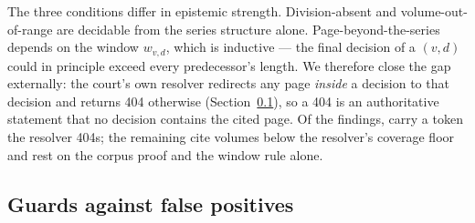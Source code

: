 \documentclass[11pt,a4paper]{article}
\begin{document}
The three conditions differ in epistemic strength. Division-absent and
volume-out-of-range are decidable from the series structure alone.
Page-beyond-the-series depends on the window $w_{v,d}$, which is
inductive --- the final decision of a $(v,d)$ could in principle exceed
every predecessor's length. We therefore close the gap externally: the
court's own resolver redirects any page \emph{inside} a decision to
that decision and returns 404 otherwise (Section~\ref{sec:guards}), so
a 404 is an authoritative statement that no decision contains the
cited page. Of the \NFindings{} findings, \NFindConfirmed{} carry a
token the resolver 404s; the remaining \NFindOOC{} cite volumes below
the resolver's coverage floor and rest on the corpus proof and the
window rule alone.



\subsection{Guards against false positives}\label{sec:guards}
\end{document}
